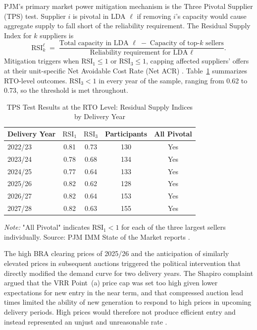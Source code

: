 PJM's primary market power mitigation mechanism is the Three Pivotal
Supplier (TPS) test. Supplier $i$ is pivotal in LDA $\ell$ if
removing $i$'s capacity would cause aggregate supply to fall short
of the reliability requirement. The Residual Supply Index for $k$
suppliers is
\begin{equation}
  \mathrm{RSI}_{k}^{\ell} \;=\;
  \frac{\text{Total capacity in LDA }\ell
        \;-\; \text{Capacity of top-}k\text{ sellers}}
       {\text{Reliability requirement for LDA }\ell}.
  \label{eq:rsi}
\end{equation}
Mitigation triggers when $\mathrm{RSI}_1 \leq 1$ or
$\mathrm{RSI}_3 \leq 1$, capping affected suppliers' offers at
their unit-specific Net Avoidable Cost Rate (Net ACR)
\citep{Bowring2013_pjm, MonitoringAnalytics2025_sotm}.
Table~\ref{tab:tps_results} summarizes RTO-level outcomes.
$\mathrm{RSI}_3 < 1$ in every year of the sample, ranging from 0.62
to 0.73, so the threshold is met throughout.

\begin{table}[H]
  \centering
  \caption{TPS Test Results at the RTO Level: Residual Supply Indices by Delivery Year}
  \label{tab:tps_results}
  \begin{tabular}{lcccc}
    \toprule
    Delivery Year & $\mathrm{RSI}_1$ & $\mathrm{RSI}_3$ &
      Participants & All Pivotal \\
    \midrule
    2022/23 & 0.81 & 0.73 & 130 & Yes \\
    2023/24 & 0.78 & 0.68 & 134 & Yes \\
    2024/25 & 0.77 & 0.64 & 133 & Yes \\
    2025/26 & 0.82 & 0.62 & 128 & Yes \\
    2026/27 & 0.82 & 0.64 & 153 & Yes \\
    2027/28 & 0.82 & 0.63 & 155 & Yes \\
    \bottomrule
  \end{tabular}
  \vspace{3pt}

  \begin{minipage}{0.92\textwidth}
    \footnotesize \textit{Note:} "All Pivotal" indicates
    $\mathrm{RSI}_1 < 1$ for each of the three largest sellers
    individually. Source: PJM IMM State of the Market reports
    \citep{MonitoringAnalytics2025_sotm}.
  \end{minipage}
\end{table}

The high BRA clearing prices of 2025/26 and the anticipation of
similarly elevated prices in subsequent auctions triggered the
political intervention that directly modified the demand curve for
two delivery years. The Shapiro complaint argued that the VRR Point~(a)
price cap was set too high given lower expectations for new entry
in the near term, and that compressed auction lead times limited
the ability of new generation to respond to high prices in upcoming
delivery periods. High prices would therefore not produce efficient
entry and instead represented an unjust and unreasonable rate
\citep{PJM2025_settlement_slides}.

